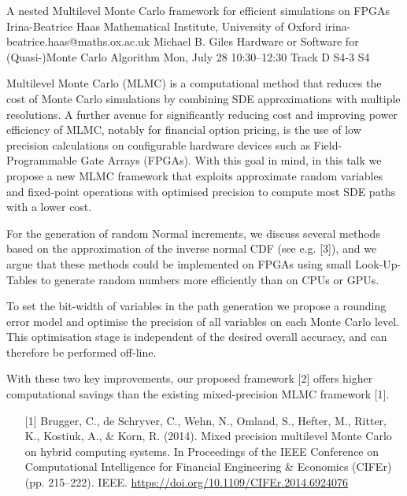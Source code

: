 \begin{talk}
  {A nested Multilevel Monte Carlo framework for efficient simulations on FPGAs}%
  {Irina-Beatrice Haas}%
  {Mathematical Institute, University of Oxford}%
  {irina-beatrice.haas@maths.ox.ac.uk}%
  {Michael B. Giles}%
  {Hardware or Software for (Quasi-)Monte Carlo Algorithm}%
  {Mon, July 28 10:30–12:30 Track D}%
  {S4-3}%
  {S4}%
				
			

Multilevel Monte Carlo (MLMC) is a computational method that reduces the cost of Monte Carlo simulations by combining SDE approximations with multiple resolutions. A further avenue for significantly reducing cost and improving power efficiency of MLMC, notably for financial option pricing, is the use of low precision calculations on configurable hardware devices such as Field-Programmable Gate Arrays (FPGAs). With this goal in mind, in this talk we propose a new MLMC framework that exploits approximate random variables and fixed-point operations with optimised precision to compute most SDE paths with a lower cost.

For the generation of random Normal increments, we discuss several methods based on the approximation of the inverse normal CDF (see e.g. [3]), and we argue that these methods could be implemented on FPGAs using small Look-Up-Tables to generate random numbers more efficiently than on CPUs or GPUs. 

To set the bit-width of variables in the path generation we propose a rounding error model and optimise the precision of all variables on each Monte Carlo level. This optimisation stage is independent of the desired overall accuracy, and can therefore be performed off-line. 

With these two key improvements, our proposed framework [2] offers higher computational
savings than the existing mixed-precision MLMC framework [1].


\medskip


\begin{enumerate}

    \item[{[1]}] Brugger, C., de Schryver, C., Wehn, N., Omland, S., Hefter, M., Ritter, K., Kostiuk, A., \& Korn, R. (2014). Mixed precision multilevel Monte Carlo on hybrid computing systems. In Proceedings of the IEEE Conference on Computational Intelligence for Financial Engineering \& Economics (CIFEr) (pp. 215–222). IEEE. \url{https://doi.org/10.1109/CIFEr.2014.6924076}
    

\end{enumerate}
\end{talk}
